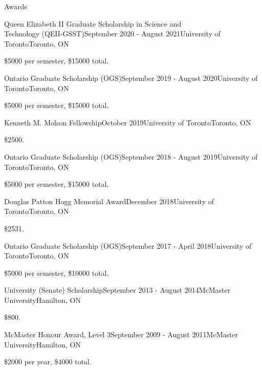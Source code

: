 \documentclass[usenames, dvipsnames]{resume} %
\begin{document}

\begin{rSection}{Awards}
	\begin{rSubsection}{Queen Elizabeth II Graduate Scholarship in Science and \\ Technology (QEII-GSST)}{September 2020 - August 2021}{University of Toronto}{Toronto, ON}
		\item \$5000 per semester, \$15000 total.
	\end{rSubsection}
	
	\begin{rSubsection}{Ontario Graduate Scholarship (OGS)}{September 2019 - August 2020}{University of Toronto}{Toronto, ON}
		\item \$5000 per semester, \$15000 total.
	\end{rSubsection}
	
	\begin{rSubsection}{Kenneth M. Molson Fellowship}{October 2019}{University of Toronto}{Toronto, ON}
		\item \$2500.
	\end{rSubsection}
	
	\begin{rSubsection}{Ontario Graduate Scholarship (OGS)}{September 2018 - August 2019}{University of Toronto}{Toronto, ON}
		\item \$5000 per semester, \$15000 total.
	\end{rSubsection}
	
	\begin{rSubsection}{Douglas Patton Hogg Memorial Award}{December 2018}{University of Toronto}{Toronto, ON}
		\item \$2531.
	\end{rSubsection}
	
	\begin{rSubsection}{Ontario Graduate Scholarship (OGS)}{September 2017 - April 2018}{University of Toronto}{Toronto, ON}
		\item \$5000 per semester, \$10000 total.
	\end{rSubsection}
	
	\begin{rSubsection}{University (Senate) Scholarship}{September 2013 - August 2014}{McMaster University}{Hamilton, ON}
		\item \$800.
	\end{rSubsection}
	
	\begin{rSubsection}{McMaster Honour Award, Level 3}{September 2009 - August 2011}{McMaster University}{Hamilton, ON}
		\item \$2000 per year, \$4000 total.
	\end{rSubsection}
	
	
	
\end{rSection}
\end{document}
